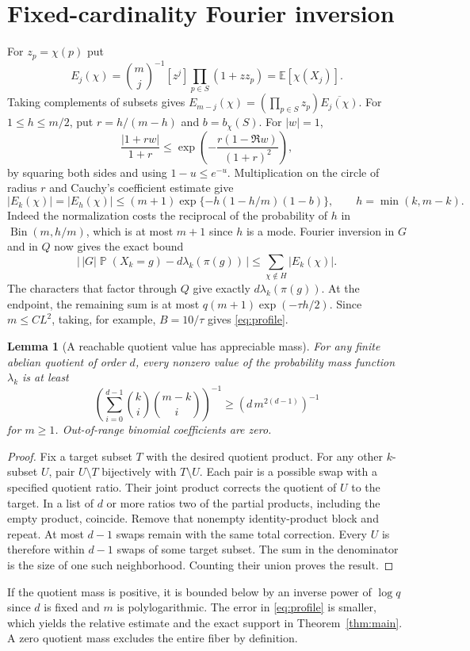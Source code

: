 \documentclass[11pt]{article}
\newtheorem{lemma}[theorem]{Lemma}
\DeclareMathOperator{\Prob}{\mathbb P}
\begin{document}
\section{Fixed-cardinality Fourier inversion}
For $z_p=\chi(p)$ put
\[
 E_j(\chi)=\binom mj^{-1}[z^j]\prod_{p\in S}(1+zz_p)
          =\mathbb E[\chi(X_j)] .
\]
Taking complements of subsets gives
$E_{m-j}(\chi)=(\prod_{p\in S}z_p)\overline{E_j(\chi)}$.
For $1\le h\le m/2$, put $r=h/(m-h)$ and $b=b_\chi(S)$.
For $|w|=1$,
\[
 \frac{|1+rw|}{1+r}
 \le\exp\!\left(-\frac{r(1-\Re w)}{(1+r)^2}\right),
\]
by squaring both sides and using $1-u\le e^{-u}$. Multiplication on the
circle of radius $r$ and Cauchy's coefficient estimate give
\begin{equation}\label{eq:circle}
 |E_k(\chi)|=|E_h(\chi)|\le (m+1)
       \exp\{-h(1-h/m)(1-b)\},\qquad h=\min(k,m-k).
\end{equation}
Indeed the normalization costs the reciprocal of the probability of $h$ in
$\operatorname{Bin}(m,h/m)$, which is at most $m+1$ since $h$ is a mode.
Fourier inversion in $G$ and in $Q$ now gives the exact bound
\begin{equation}\label{eq:inv}
 |\,|G|\Prob(X_k=g)-d\lambda_k(\pi(g))\,|
 \le\sum_{\chi\notin H}|E_k(\chi)|.
\end{equation}
The characters that factor through $Q$ give exactly $d\lambda_k(\pi(g))$.
At the endpoint, the remaining sum is at most
$q(m+1)\exp(-\tau h/2)$. Since $m\le CL^2$, taking, for example,
$B=10/\tau$ gives \eqref{eq:profile}.

\begin{lemma}[A reachable quotient value has appreciable mass]\label{lem:swap}
For any finite abelian quotient of order $d$, every nonzero value of the
probability mass function $\lambda_k$ is at least
\[
 \left(\sum_{i=0}^{d-1}\binom ki\binom{m-k}i\right)^{-1}
 \ge (d\,m^{2(d-1)})^{-1}
\]
for $m\ge1$. Out-of-range binomial coefficients are zero.
\end{lemma}
\begin{proof}
Fix a target subset $T$ with the desired quotient product. For any other
$k$-subset $U$, pair $U\setminus T$ bijectively with $T\setminus U$.
Each pair is a possible swap with a specified quotient ratio. Their joint
product corrects the quotient of $U$ to the target. In a list of $d$ or more
ratios two of the partial products, including the empty product, coincide.
Remove that nonempty identity-product block and repeat. At most $d-1$ swaps
remain with the same total correction. Every $U$ is therefore within $d-1$
swaps of some target subset. The sum in the denominator is the size of
one such neighborhood. Counting their union proves the result.
\end{proof}
If the quotient mass is positive, it is bounded below by an inverse power
of $\log q$ since $d$ is fixed and $m$ is polylogarithmic.
The error in \eqref{eq:profile} is smaller, which yields the relative estimate
and the exact support in Theorem~\ref{thm:main}. A zero quotient mass
excludes the entire fiber by definition.
\end{document}
